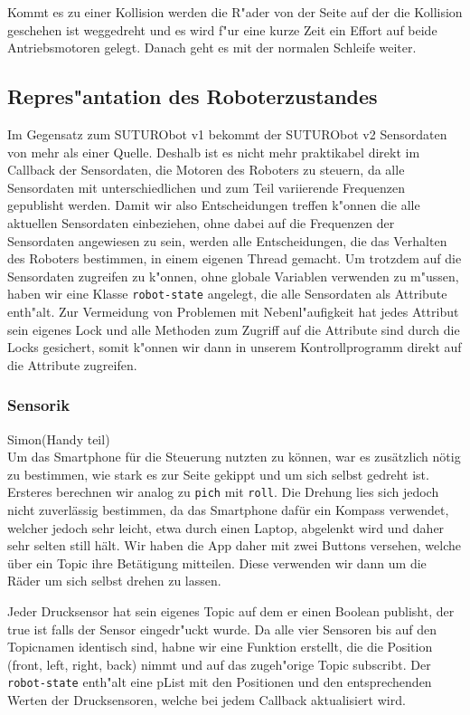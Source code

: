 \documentclass[8pt]{article}
\begin{document}
Kommt es zu einer Kollision werden die R"ader von der Seite auf der die Kollision geschehen ist weggedreht und es wird f"ur eine kurze Zeit ein Effort auf beide Antriebsmotoren gelegt. Danach geht es mit der normalen Schleife weiter.

 
\subsection{Repres"antation des Roboterzustandes}
Im Gegensatz zum SUTURObot v1 bekommt der SUTURObot v2 Sensordaten von mehr als einer Quelle. Deshalb ist es nicht mehr praktikabel direkt im Callback der Sensordaten, die Motoren des Roboters zu steuern, da alle Sensordaten mit unterschiedlichen und zum Teil variierende Frequenzen gepublisht werden. Damit wir also Entscheidungen treffen k"onnen die alle aktuellen Sensordaten einbeziehen, ohne dabei auf die Frequenzen der Sensordaten angewiesen zu sein, werden alle Entscheidungen, die das Verhalten des Roboters bestimmen, in einem eigenen Thread gemacht. Um trotzdem auf die Sensordaten zugreifen zu k"onnen, ohne globale Variablen verwenden zu m"ussen, haben wir eine Klasse \texttt{robot-state} angelegt, die alle Sensordaten als Attribute enth"alt. Zur Vermeidung von Problemen mit Nebenl"aufigkeit hat jedes Attribut sein eigenes Lock und alle Methoden zum Zugriff auf die Attribute sind durch die Locks gesichert, somit k"onnen wir dann in unserem Kontrollprogramm direkt auf die Attribute zugreifen. 

\subsubsection{Sensorik} 
Simon(Handy teil)\\

Um das Smartphone für die Steuerung nutzten zu können, war es zusätzlich nötig zu bestimmen, wie stark es zur Seite gekippt und um sich selbst gedreht ist. Ersteres berechnen wir analog zu \texttt{pich} mit \texttt{roll}. Die Drehung lies sich jedoch nicht zuverlässig bestimmen, da das Smartphone dafür ein Kompass verwendet, welcher jedoch sehr leicht, etwa durch einen Laptop, abgelenkt wird und daher sehr selten still hält. Wir haben die App daher mit zwei Buttons versehen, welche über ein Topic ihre Betätigung mitteilen. Diese verwenden wir dann um die Räder um sich selbst drehen zu lassen.

Jeder Drucksensor hat sein eigenes Topic auf dem er einen Boolean publisht, der true ist falls der Sensor eingedr"uckt wurde. Da alle vier Sensoren bis auf den Topicnamen identisch sind, habne wir eine Funktion erstellt, die die Position (front, left, right, back) nimmt und auf das zugeh"orige Topic subscribt. Der \texttt{robot-state} enth"alt eine pList mit den Positionen und den entsprechenden Werten der Drucksensoren, welche bei jedem Callback aktualisiert wird.
\end{document}
